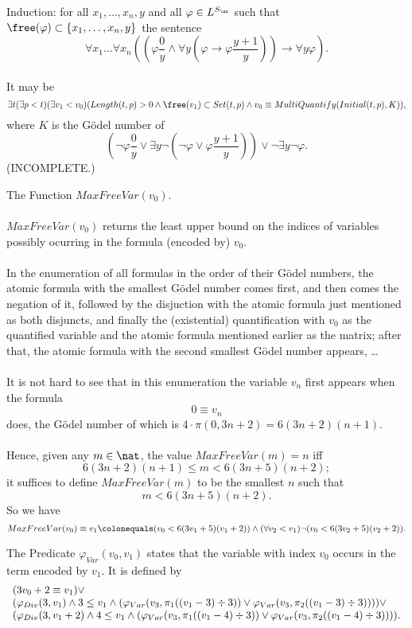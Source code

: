 Induction: for all $x_1, \ldots, x_n, y$ and all $\varphi \in L^{S_\ar}$ such that $\free(\varphi) \subset \{ x_1, \ldots, x_n, y \}$ the sentence
\[
\forall x_1 \ldots \forall x_n \left( (\varphi\frac{0}{y} \land \forall y (\varphi \rightarrow \varphi\frac{y + 1}{y})) \rightarrow \forall y \varphi \right).
\]
\ \\
It may be
\[
\exists t (\exists p < t)(\exists v_1 < v_0)(Length(t, p) > 0 \land \free (v_1) \subset Set(t, p) \land v_0 \equiv MultiQuantify(Initial(t, p), K)),
\]
where $K$ is the G\"{o}del number of
\[
(\neg \varphi\frac{0}{y} \lor \exists y \neg (\neg\varphi \lor \varphi\frac{y + 1}{y})) \lor \neg\exists y \neg\varphi.
\]
(INCOMPLETE.)
%
\item The Function $MaxFreeVar(v_0)$.\\
\ \\
$MaxFreeVar(v_0)$ returns the least upper bound on the indices of variables possibly ocurring in the formula (encoded by) $v_0$.\\
\ \\
In the enumeration of all formulas in the order of their G\"{o}del numbers, the atomic formula with the smallest G\"{o}del number comes first, and then comes the negation of it, followed by the disjuction with the atomic formula just mentioned as both disjuncts, and finally the (existential) quantification with $v_0$ as the quantified variable and the atomic formula mentioned earlier as the matrix; after that, the atomic formula with the second smallest G\"{o}del number appears, \ldots\\
\ \\
It is not hard to see that in this enumeration the variable $v_n$ first appears when the formula
\[
0 \equiv v_n
\]
does, the G\"{o}del number of which is $4 \cdot \pi(0, 3n + 2) = 6(3n + 2)(n + 1)$.\\
\ \\
Hence, given any $m \in \nat$, the value $MaxFreeVar(m) = n$ iff
\[
6(3n + 2)(n + 1) \leq m < 6(3n + 5)(n + 2);
\]
it suffices to define $MaxFreeVar(m)$ to be the smallest $n$ such that
\[
m < 6(3n + 5)(n + 2).
\]
So we have
\[
MaxFreeVar(v_0) \equiv v_1 \colonequals (v_0 < 6(3v_1 + 5)(v_1 + 2)) \land (\forall v_2 < v_1)\neg(v_0 < 6(3v_2 + 5)(v_2 + 2)).
\]
%
\item The Predicate $\varphi_{Var}(v_0, v_1)$ states that the variable with index $v_0$ occurs in the term encoded by $v_1$. It is defined by
\[
\begin{array}{l}
(3v_0 + 2 \equiv v_1) \lor\cr
(\varphi_{Div}(3, v_1) \land 3 \leq v_1 \land (\varphi_{Var}(v_3, \pi_1 ((v_1 - 3) \div 3)) \lor \varphi_{Var}(v_3, \pi_2 ((v_1 - 3) \div 3)))) \lor\cr
(\varphi_{Div}(3, v_1 + 2) \land 4 \leq v_1 \land (\varphi_{Var}(v_3, \pi_1 ((v_1 - 4) \div 3)) \lor \varphi_{Var}(v_3, \pi_2 ((v_1 - 4) \div 3)))).
\end{array}
\]
